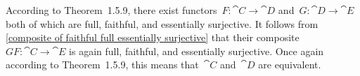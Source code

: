 \subsubsection{}

According to Theorem~1.5.9, there exist functors~$F \colon \cat{C} \to \cat{D}$ and~$G \colon \cat{D} \to \cat{E}$ both of which are full, faithful, and essentially surjective.
It follows from \cref{composite of faithful full essentially surjective} that their composite~$G F \colon \cat{C} \to \cat{E}$ is again full, faithful, and essentially surjective.
Once again according to Theorem~1.5.9, this means that~$\cat{C}$ and~$\cat{D}$ are equivalent.
